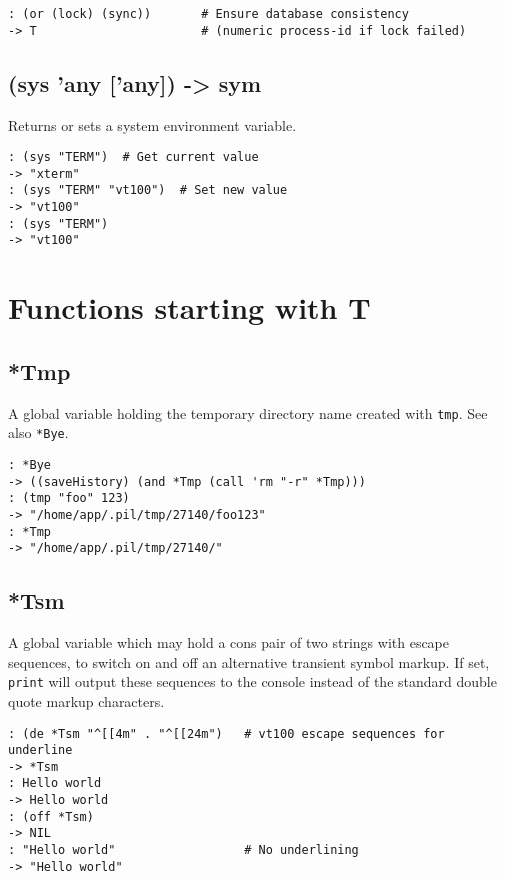 {{{{{{{{\begin{verbatim}
: (or (lock) (sync))       # Ensure database consistency
-> T                       # (numeric process-id if lock failed)
\end{verbatim}

 
\section{(sys 'any ['any]) -> sym}
\label{sec-8-1-19-50}


Returns or sets a system environment variable.


\begin{verbatim}
: (sys "TERM")  # Get current value
-> "xterm"
: (sys "TERM" "vt100")  # Set new value
-> "vt100"
: (sys "TERM")
-> "vt100"
\end{verbatim}


\chapter{Functions starting with T}
\label{sec-8-1-20}


 
\section{*Tmp}
\label{sec-8-1-20-1}


A global variable holding the temporary directory name created with
\texttt{tmp}. See also \texttt{*Bye}.


\begin{verbatim}
: *Bye
-> ((saveHistory) (and *Tmp (call 'rm "-r" *Tmp)))
: (tmp "foo" 123)
-> "/home/app/.pil/tmp/27140/foo123"
: *Tmp
-> "/home/app/.pil/tmp/27140/"
\end{verbatim}

 
\section{*Tsm}
\label{sec-8-1-20-2}


A global variable which may hold a cons pair of two strings with escape
sequences, to switch on and off an alternative transient symbol markup.
If set, \texttt{print} will output these sequences to the console instead of
the standard double quote markup characters.


\begin{verbatim}
: (de *Tsm "^[[4m" . "^[[24m")   # vt100 escape sequences for underline
-> *Tsm
: Hello world
-> Hello world
: (off *Tsm)
-> NIL
: "Hello world"                  # No underlining
-> "Hello world"
\end{verbatim}

}}}}}}}}
